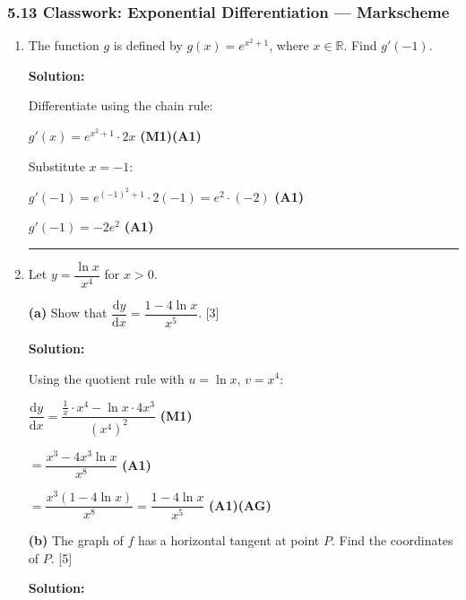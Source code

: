 \documentclass[12pt, twoside]{article}
\begin{document}
\subsubsection*{5.13 Classwork: Exponential Differentiation --- Markscheme}

\begin{enumerate}[itemsep=0.3cm]

\item[1.] [Maximum mark: 4]

The function $g$ is defined by $g(x) = e^{x^2 + 1}$, where $x \in \mathbb{R}$.
Find $g'(-1)$.

\textbf{Solution:}

Differentiate using the chain rule:

$g'(x) = e^{x^2 + 1} \cdot 2x$ \hfill \textbf{(M1)(A1)}

\smallskip
Substitute $x = -1$:

$g'(-1) = e^{(-1)^2 + 1} \cdot 2(-1) = e^2 \cdot (-2)$ \hfill \textbf{(A1)}

$g'(-1) = -2e^2$ \hfill \textbf{(A1)}

\bigskip

\hrule

\bigskip

\item[2.] [Maximum mark: 16]

Let $y = \dfrac{\ln x}{x^4}$ for $x > 0$.

\medskip

\textbf{(a)} Show that $\dfrac{\mathrm{d}y}{\mathrm{d}x}
= \dfrac{1 - 4\ln x}{x^5}$. \hfill [3]

\textbf{Solution:}

Using the quotient rule with $u = \ln x$, $v = x^4$:

$\dfrac{\mathrm{d}y}{\mathrm{d}x}
= \dfrac{\frac{1}{x} \cdot x^4 - \ln x \cdot 4x^3}{(x^4)^2}$ \hfill \textbf{(M1)}

$= \dfrac{x^3 - 4x^3 \ln x}{x^8}$ \hfill \textbf{(A1)}

$= \dfrac{x^3(1 - 4\ln x)}{x^8}
= \dfrac{1 - 4\ln x}{x^5}$ \hfill \textbf{(A1)(AG)}

\newpage

\textbf{(b)} The graph of $f$ has a horizontal tangent at point $P$.
Find the coordinates of $P$. \hfill [5]

\textbf{Solution:}


\end{enumerate}
\end{document}
